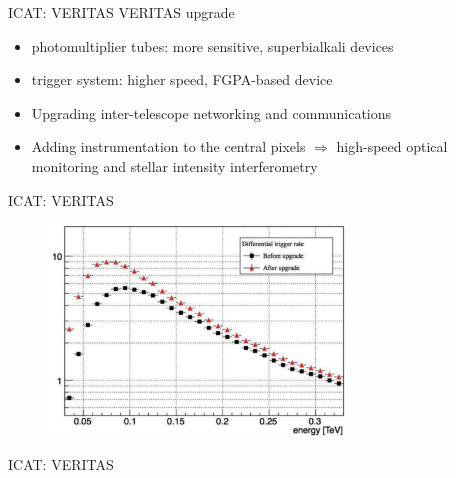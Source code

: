 \documentclass{beamer}
\begin{document}
\begin{frame}{ICAT: VERITAS}
    VERITAS upgrade
    \begin{itemize}
        \item  photomultiplier tubes: more sensitive, superbialkali devices
        \item trigger system: higher speed, FGPA-based device
        \item Upgrading inter-telescope networking and communications
        \item Adding instrumentation to the central pixels $\Rightarrow$ high-speed optical monitoring and stellar intensity interferometry
    \end{itemize}
\end{frame}



\begin{frame}{ICAT: VERITAS}
    \begin{figure}[h]
        \includegraphics[width=300px]{VERITAS_upgrade.png}
    \end{figure}
\end{frame}


\begin{frame}{ICAT: VERITAS}
\end{frame}
\end{document}
